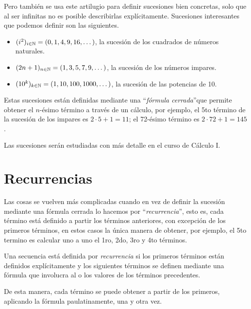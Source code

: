 Pero también se usa este artilugio para definir sucesiones bien concretas, solo que al ser infinitas no es posible describirlas explícitamente. Sucesiones interesantes que podemos definir son las siguientes.

\begin{itemize}
\item $(i^2)_{i\in\mathbb{N}}=(0,1,4,9,16,\dots)$, la sucesión de los cuadrados de números naturales.
\item $(2n+1)_{n\in\mathbb{N}}=(1,3,5,7,9,\dots)$, la sucesión de los números impares.
\item $(10^k)_{k\in\mathbb{N}}=(1,10,100,1000,\dots)$, la sucesión de las potencias de 10.
\end{itemize}

Estas sucesiones están definidas mediante una ``\emph{fórmula cerrada}''que permite obtener el $n$-ésimo término a través de un cálculo, por ejemplo, el 5to término de la sucesión de los impares es $2\cdot 5+1=11$; el 72-ésimo término es $2\cdot 72+1=145$.

Las sucesiones serán estudiadas con más detalle en el curso de Cálculo I.

\section{Recurrencias}

Las cosas se vuelven más complicadas cuando en vez de definir la sucesión mediante una fórmula cerrada lo hacemos por ``\emph{recurrencia}'', esto es, cada término está definido a partir los términos anteriores, con excepción de los primeros términos, en estos casos la única manera de obtener, por ejemplo, el 5to termino es calcular uno a uno el 1ro, 2do, 3ro y 4to términos.

\medskip

\begin{defn}
Una secuencia está definida por \emph{recurrencia} si los primeros términos están definidos explícitamente y los siguientes términos se definen mediante una fórmula que involucra al o los valores de los términos precedentes.

De esta manera, cada término se puede obtener a partir de los primeros, aplicando la fórmula paulatinamente, una y otra vez.
\end{defn}
\medskip

